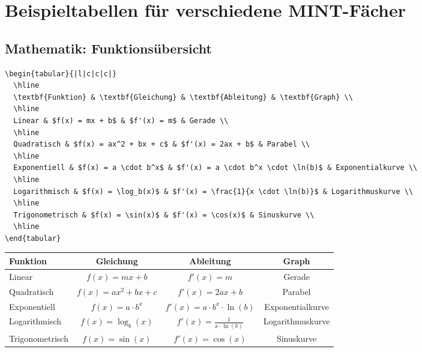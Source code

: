 \documentclass[12pt,a4paper]{article}
\begin{document}
\section{Beispieltabellen für verschiedene MINT-Fächer}

\subsection{Mathematik: Funktionsübersicht}

\begin{lstlisting}[style=latex]
\begin{tabular}{|l|c|c|c|}
  \hline
  \textbf{Funktion} & \textbf{Gleichung} & \textbf{Ableitung} & \textbf{Graph} \\
  \hline
  Linear & $f(x) = mx + b$ & $f'(x) = m$ & Gerade \\
  \hline
  Quadratisch & $f(x) = ax^2 + bx + c$ & $f'(x) = 2ax + b$ & Parabel \\
  \hline
  Exponentiell & $f(x) = a \cdot b^x$ & $f'(x) = a \cdot b^x \cdot \ln(b)$ & Exponentialkurve \\
  \hline
  Logarithmisch & $f(x) = \log_b(x)$ & $f'(x) = \frac{1}{x \cdot \ln(b)}$ & Logarithmuskurve \\
  \hline
  Trigonometrisch & $f(x) = \sin(x)$ & $f'(x) = \cos(x)$ & Sinuskurve \\
  \hline
\end{tabular}
\end{lstlisting}

\begin{ausgabe}
\begin{center}
\begin{tabular}{|l|c|c|c|}
  \hline
  \textbf{Funktion} & \textbf{Gleichung} & \textbf{Ableitung} & \textbf{Graph} \\
  \hline
  Linear & $f(x) = mx + b$ & $f'(x) = m$ & Gerade \\
  \hline
  Quadratisch & $f(x) = ax^2 + bx + c$ & $f'(x) = 2ax + b$ & Parabel \\
  \hline
  Exponentiell & $f(x) = a \cdot b^x$ & $f'(x) = a \cdot b^x \cdot \ln(b)$ & Exponentialkurve \\
  \hline
  Logarithmisch & $f(x) = \log_b(x)$ & $f'(x) = \frac{1}{x \cdot \ln(b)}$ & Logarithmuskurve \\
  \hline
  Trigonometrisch & $f(x) = \sin(x)$ & $f'(x) = \cos(x)$ & Sinuskurve \\
  \hline
\end{tabular}
\end{center}
\end{ausgabe}
\end{document}
